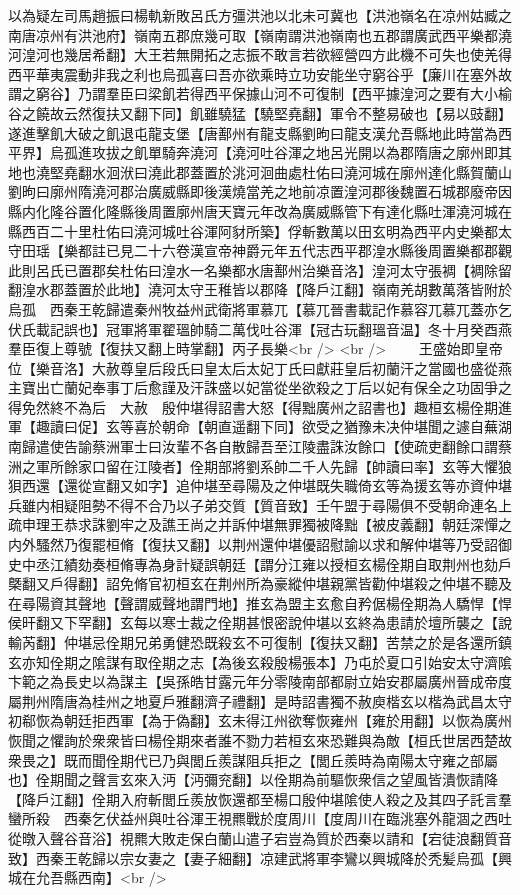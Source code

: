以為疑左司馬趙振曰楊軌新敗呂氏方彊洪池以北未可冀也【洪池嶺名在凉州姑臧之南唐凉州有洪池府】嶺南五郡庶幾可取【嶺南謂洪池嶺南也五郡謂廣武西平樂都澆河湟河也幾居希翻】大王若無開拓之志振不敢言若欲經營四方此機不可失也使羌得西平華夷震動非我之利也烏孤喜曰吾亦欲乘時立功安能坐守窮谷乎【廉川在塞外故謂之窮谷】乃謂羣臣曰梁飢若得西平保據山河不可復制【西平據湟河之要有大小榆谷之饒故云然復扶又翻下同】飢雖驍猛【驍堅堯翻】軍令不整易破也【易以豉翻】遂進擊飢大破之飢退屯龍支堡【唐鄯州有龍支縣劉昫曰龍支漢允吾縣地此時當為西平界】烏孤進攻拔之飢單騎奔澆河【澆河吐谷渾之地呂光開以為郡隋唐之廓州即其地也澆堅堯翻水洄洑曰澆此郡蓋置於洮河洄曲處杜佑曰澆河城在廓州達化縣賀蘭山劉昫曰廓州隋澆河郡治廣威縣即後漢燒當羌之地前凉置湟河郡後魏置石城郡廢帝因縣内化隆谷置化隆縣後周置廓州唐天寶元年改為廣威縣管下有達化縣吐渾澆河城在縣西百二十里杜佑曰澆河城吐谷渾阿豺所築】俘斬數萬以田玄明為西平内史樂都太守田瑶【樂都註已見二十六卷漢宣帝神爵元年五代志西平郡湟水縣後周置樂都郡觀此則呂氏已置郡矣杜佑曰湟水一名樂都水唐鄯州治樂音洛】湟河太守張裯【裯除留翻湟水郡蓋置於此地】澆河太守王稚皆以郡降【降戶江翻】嶺南羌胡數萬落皆附於烏孤　西秦王乾歸遣秦州牧益州武衛將軍慕兀【慕兀晉書載記作慕容兀慕兀蓋亦乞伏氏載記誤也】冠軍將軍翟瑥帥騎二萬伐吐谷渾【冠古玩翻瑥音温】冬十月癸酉燕羣臣復上尊號【復扶又翻上時掌翻】丙子長樂<br />
<br />
　　王盛始即皇帝位【樂音洛】大赦尊皇后段氏曰皇太后太妃丁氏曰獻莊皇后初蘭汗之當國也盛從燕主寶出亡蘭妃奉事丁后愈謹及汗誅盛以妃當從坐欲殺之丁后以妃有保全之功固爭之得免然終不為后　大赦　殷仲堪得詔書大怒【得黜廣州之詔書也】趣桓玄楊佺期進軍【趣讀曰促】玄等喜於朝命【朝直遥翻下同】欲受之猶豫未决仲堪聞之遽自蕪湖南歸遣使告諭蔡洲軍士曰汝輩不各自散歸吾至江陵盡誅汝餘口【使疏吏翻餘口謂蔡洲之軍所餘家口留在江陵者】佺期部將劉系帥二千人先歸【帥讀曰率】玄等大懼狼狽西還【還從宣翻又如字】追仲堪至尋陽及之仲堪既失職倚玄等為援玄等亦資仲堪兵雖内相疑阻勢不得不合乃以子弟交質【質音致】壬午盟于尋陽俱不受朝命連名上疏申理王恭求誅劉牢之及譙王尚之并訴仲堪無罪獨被降黜【被皮義翻】朝廷深憚之内外騷然乃復罷桓脩【復扶又翻】以荆州還仲堪優詔慰諭以求和解仲堪等乃受詔御史中丞江績劾奏桓脩專為身計疑誤朝廷【謂分江雍以授桓玄楊佺期自取荆州也劾戶槩翻又戶得翻】詔免脩官初桓玄在荆州所為豪縱仲堪親黨皆勸仲堪殺之仲堪不聽及在尋陽資其聲地【聲謂威聲地謂門地】推玄為盟主玄愈自矜倨楊佺期為人驕悍【悍侯旰翻又下罕翻】玄每以寒士裁之佺期甚恨密說仲堪以玄終為患請於壇所襲之【說輸芮翻】仲堪忌佺期兄弟勇健恐既殺玄不可復制【復扶又翻】苦禁之於是各還所鎮玄亦知佺期之隂謀有取佺期之志【為後玄殺殷楊張本】乃屯於夏口引始安太守濟隂卞範之為長史以為謀主【吳孫皓甘露元年分零陵南部都尉立始安郡屬廣州晉成帝度屬荆州隋唐為桂州之地夏戶雅翻濟子禮翻】是時詔書獨不赦庾楷玄以楷為武昌太守初郗恢為朝廷拒西軍【為于偽翻】玄未得江州欲奪恢雍州【雍於用翻】以恢為廣州恢聞之懼詢於衆衆皆曰楊佺期來者誰不勠力若桓玄來恐難與為敵【桓氏世居西楚故衆畏之】既而聞佺期代已乃與閭丘羨謀阻兵拒之【閭丘羨時為南陽太守雍之部屬也】佺期聞之聲言玄來入沔【沔彌兖翻】以佺期為前驅恢衆信之望風皆潰恢請降【降戶江翻】佺期入府斬閭丘羨放恢還都至楊口殷仲堪隂使人殺之及其四子託言羣蠻所殺　西秦乞伏益州與吐谷渾王視羆戰於度周川【度周川在臨洮塞外龍涸之西吐從暾入聲谷音浴】視羆大敗走保白蘭山遣子宕豈為質於西秦以請和【宕徒浪翻質音致】西秦王乾歸以宗女妻之【妻子細翻】凉建武將軍李鸞以興城降於秃髪烏孤【興城在允吾縣西南】<br />
